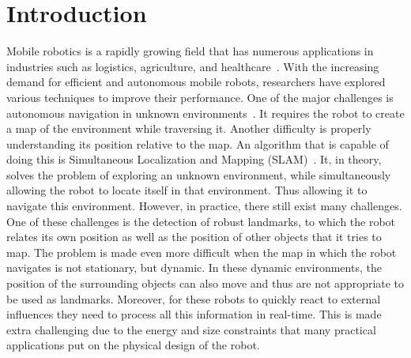 \chapter{Introduction}\label{chapter:introduction}

Mobile robotics is a rapidly growing field that has numerous applications in industries such as logistics, agriculture, and healthcare~\cite{cognominal2021evolving,kebede2024review,clark2023amazon}. With the increasing demand for efficient and autonomous mobile robots, researchers have explored various techniques to improve their performance. One of the major challenges is autonomous navigation in unknown environments~\cite{alatise2020review}. It requires the robot to create a map of the environment while traversing it. Another difficulty is properly understanding its position relative to the map. An algorithm that is capable of doing this is Simultaneous Localization and Mapping (SLAM)~\cite{whyte1996slam,whyte2006slam}. It, in theory, solves the problem of exploring an unknown environment, while simultaneously allowing the robot to locate itself in that environment. Thus allowing it to navigate this environment. However, in practice, there still exist many challenges. One of these challenges is the detection of robust landmarks, to which the robot relates its own position as well as the position of other objects that it tries to map. The problem is made even more difficult when the map in which the robot navigates is not stationary, but dynamic. In these dynamic environments, the position of the surrounding objects can also move and thus are not appropriate to be used as landmarks. Moreover, for these robots to quickly react to external influences they need to process all this information in real-time. This is made extra challenging due to the energy and size constraints that many practical applications put on the physical design of the robot.


